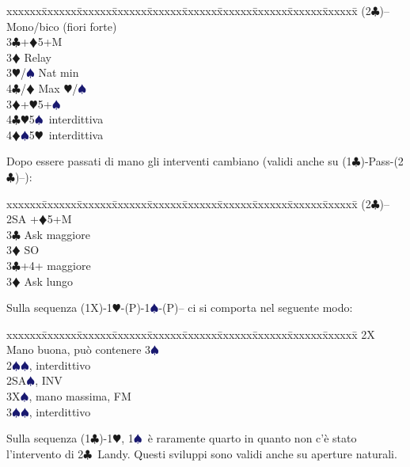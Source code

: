 \documentclass[a4paper,italian]{article}
\newcommand{\BC}{\textcolor{OliveGreen}{$\clubsuit$}}
\newcommand{\BD}{\textcolor{RedOrange}{$\vardiamondsuit$}}
\newcommand{\BH}{\textcolor{Red2}{$\varheartsuit${}}}
\newcommand{\BS}{\textcolor{MidnightBlue}{$\spadesuit${}}}
\newenvironment{bidtable}
{\begin{tabbing}

    xxxxxx\=xxxxxx\=xxxxxx\=xxxxxx\=xxxxxx\=xxxxxx\=xxxxxx\=xxxxxx\=xxxxxx\=xxxxxx\=\kill}
{\end{tabbing} }%
\newenvironment{sviluppi}
{\begin{tcolorbox}[colframe=azzurro,title=Sviluppi particolari]}
    {
\end{tcolorbox} }%
\begin{document}
\begin{multicols}{2}
                                        \begin{bidtable}
                                            (2\BC)-- \> Mono/bico (fiori forte)\+\\
                                            3\BC {}+\BD 5+M\+\\
                                            3\BD \> Relay\+\\
                                            3\BH/\BS \> Nat min\\
                                            4\BC/\BD \> Max \BH /\BS \-\-\\
                                            3\BD {}+\BH 5+\BS \\
                                            4\BC {}\BH 5\BS\ interdittiva\\
                                            4\BD {}\BS 5\BH\ interdittiva
                                        \end{bidtable}
                                        Dopo essere passati di mano gli interventi cambiano (validi anche su (1\BC )-Pass-(2\BC )--):
                                        \begin{bidtable}
                                            (2\BC)--\+\\
                                            2SA +\BD 5+M\+\\
                                            3\BC \> Ask maggiore\\
                                            3\BD \> SO\-\\
                                            3\BC {}+4+ maggiore\+\\
                                            3\BD \> Ask lungo
                                        \end{bidtable}
                                        \begin{sviluppi}
                                            Sulla sequenza (1X)-1\BH-(P)-1\BS-(P)-- ci si comporta nel seguente modo:
                                            \begin{bidtable}
                                                2X\> Mano buona, può contenere 3\BS\\
                                                2\BS{}\BS, interdittivo\\
                                                2SA\BS, INV\\
                                                3X\BS, mano massima, FM\\
                                                3\BS{}\BS, interdittivo\\
                                            \end{bidtable}
                                            Sulla sequenza (1\BC)-1\BH, 1\BS\ è raramente quarto in quanto non c'è stato l'intervento di 2\BC\ Landy. 
                                            Questi sviluppi sono validi anche su aperture naturali.


\end{sviluppi}
\end{multicols}
\end{document}
